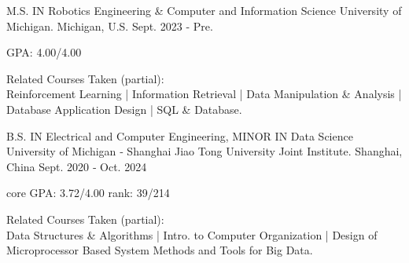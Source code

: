 

\begin{cventries}

\cventry
{M.S. IN Robotics Engineering \& Computer and Information Science} %
{University of Michigan.} %
{Michigan, U.S.} %
{Sept. 2023 ‑ Pre.} %
{
  \begin{cvitems} %
    \item {GPA: 4.00/4.00}
    \item {Related Courses Taken (partial):} \\
    Reinforcement Learning | Information Retrieval | Data Manipulation \& Analysis | Database Application Design | SQL \& Database. \\
  \end{cvitems}
}

\vspace{-0.5cm}
\cventry
{B.S. IN Electrical and Computer Engineering, MINOR IN Data Science} %
{University of Michigan ‑ Shanghai Jiao Tong University Joint Institute.} %
{Shanghai, China} %
{Sept. 2020 ‑ Oct. 2024} %
{
\begin{cvitems} %
  \item {core GPA: 3.72/4.00 \quad rank: 39/214}
  \item {Related Courses Taken (partial): }\\
  Data Structures \& Algorithms | Intro. to Computer Organization | Design of Microprocessor Based System Methods and Tools for Big Data. 
\end{cvitems}
}

\end{cventries}

